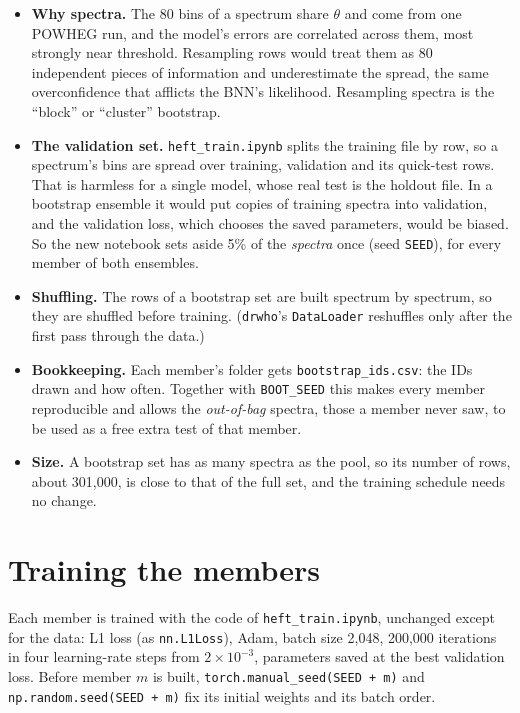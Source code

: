 \documentclass[11pt]{article}
\newcommand{\file}[1]{\nolinkurl{#1}}
\newcommand{\code}[1]{\texttt{#1}}
\begin{document}
\begin{itemize}
  \item \textbf{Why spectra.} The 80 bins of a spectrum share $\theta$ and come from one
    POWHEG run, and the model's errors are correlated across them, most strongly near
    threshold. Resampling rows would treat them as 80 independent pieces of information
    and underestimate the spread, the same overconfidence that afflicts the BNN's
    likelihood. Resampling spectra is the ``block'' or ``cluster'' bootstrap.
  \item \textbf{The validation set.} \file{heft_train.ipynb} splits the training file by
    row, so a spectrum's bins are spread over training, validation and its quick-test
    rows. That is harmless for a single model, whose real test is the holdout file. In a
    bootstrap ensemble it would put copies of training spectra into validation, and the
    validation loss, which chooses the saved parameters, would be biased. So the new
    notebook sets aside 5\% of the \emph{spectra} once (seed \code{SEED}), for every
    member of both ensembles.
  \item \textbf{Shuffling.} The rows of a bootstrap set are built spectrum by spectrum, so
    they are shuffled before training. (\code{drwho}'s \code{DataLoader} reshuffles only
    after the first pass through the data.)
  \item \textbf{Bookkeeping.} Each member's folder gets \file{bootstrap_ids.csv}: the IDs
    drawn and how often. Together with \code{BOOT\_SEED} this makes every member
    reproducible and allows the \emph{out-of-bag} spectra, those a member never saw, to be
    used as a free extra test of that member.
  \item \textbf{Size.} A bootstrap set has as many spectra as the pool, so its number of
    rows, about 301,000, is close to that of the full set, and the training schedule needs
    no change.
\end{itemize}

\section{Training the members}
\label{sec:train}

Each member is trained with the code of \file{heft_train.ipynb}, unchanged except for
the data: L1 loss (as \code{nn.L1Loss}), Adam, batch size 2,048, 200,000 iterations in
four learning-rate steps from $2 \times 10^{-3}$, parameters saved at the best
validation loss. Before member $m$ is built, \code{torch.manual\_seed(SEED + m)} and
\code{np.random.seed(SEED + m)} fix its initial weights and its batch order.
\end{document}
